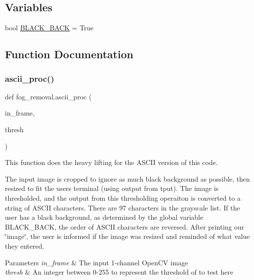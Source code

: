 \subsection*{Variables}
\begin{DoxyCompactItemize}
\item 
bool \hyperlink{namespacefog__removal_ad88aa1ec890d366b2f2c71131bc1f657}{B\+L\+A\+C\+K\+\_\+\+B\+A\+CK} = True
\end{DoxyCompactItemize}


\subsection{Function Documentation}
\mbox{\label{namespacefog__removal_a50fdb2a1e3f55a7f77230a689a372876}} 
\subsubsection{\texorpdfstring{ascii\+\_\+proc()}{ascii\_proc()}}
{\footnotesize\ttfamily def fog\+\_\+removal.\+ascii\+\_\+proc (\begin{DoxyParamCaption}\item[{}]{in\+\_\+frame,  }\item[{}]{thresh }\end{DoxyParamCaption})}



This function does the heavy lifting for the A\+S\+C\+II version of this code. 

The input image is cropped to ignore as much black background as possible, then resized to fit the user\textquotesingle{}s terminal (using output from {\ttfamily tput}). The image is thresholded, and the output from this thresholding operaiton is converted to a string of A\+S\+C\+II characters. There are 97 characters in the grayscale list. If the user has a black background, as determined by the global variable B\+L\+A\+C\+K\+\_\+\+B\+A\+CK, the order of A\+S\+C\+II characters are reversed. After printing our \char`\"{}image\char`\"{}, the user is informed if the image was resized and reminded of what value they entered.


\begin{DoxyParams}{Parameters}
{\em in\+\_\+frame} & The input 1-\/channel Open\+CV image \\
\hline
{\em thresh} & An integer between 0-\/255 to represent the threshold of to test here \\
\hline
\end{DoxyParams}



